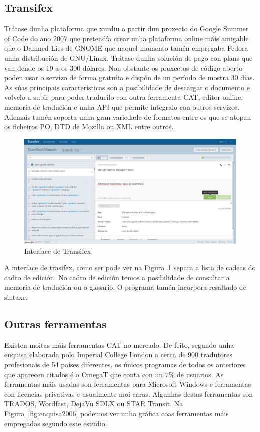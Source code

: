 \subsection{Transifex}
Trátase dunha plataforma que xurdiu a partir dun proxecto do Google Summer of Code do ano 2007 que pretendía crear unha plataforma online máis amigable que o Damned Lies de GNOME que naquel momento tamén empregaba Fedora unha distribución de GNU/Linux. Trátase dunha solución de pago con plans que van dende os 19 a os 300 dólares. Non obstante os proxectos de código aberto poden usar o servizo de forma gratuíta e dispón de un período de mostra 30 días. As súas principais características son a posibilidade de descargar o documento e volvelo a subir para poder traducilo con outra ferramenta CAT, editor online, memoria de tradución e unha API que permite integralo con outros servizos. Ademais tamén soporta unha gran variedade de formatos entre os que se atopan os ficheiros PO, DTD de Mozilla ou XML entre outros.

\begin{figure}[h]
    \centering
    \includegraphics[width=\textwidth]{img/captura_transifex.png}
    \caption{Interface de Transifex}
    \label{fig:transifex}
\end{figure}

A interface de trasifex, como ser pode ver na Figura~\ref{fig:transifex} separa a lista de cadeas do cadro de edición. No cadro de edición temos a posibilidade de consultar a memoria de tradución ou o glosario. O programa tamén incorpora resaltado de sintaxe.

\subsection{Outras ferramentas}
Existen moitas máis ferramentas CAT no mercado. De feito, segundo unha enquisa \cite{article:2006survey} elaborada polo Imperial College London a cerca de 900 tradutores profesionais de 54 países diferentes, os únicos programas de todos os anteriores que aparecen citados é o OmegaT que conta con un 7\% de usuarios. As ferramentas máis usadas son ferramentas para Microsoft Windows e ferramentas con licencias privativas e usualmente moi caras. Algunhas destas ferramentas son TRADOS, Wordfast, DejaVu SDLX ou STAR Transit. Na Figura~\ref{fig:enquisa2006} podemos ver unha gráfica coas ferramentas máis empregadas segundo este estudio.

